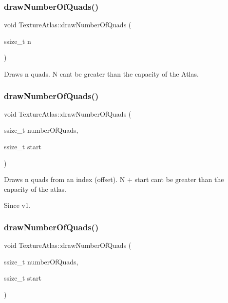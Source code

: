 \subsubsection{\texorpdfstring{draw\+Number\+Of\+Quads()}{drawNumberOfQuads()}\hspace{0.1cm}{\footnotesize\ttfamily [2/4]}}
{\footnotesize\ttfamily void Texture\+Atlas\+::draw\+Number\+Of\+Quads (\begin{DoxyParamCaption}\item[{ssize\+\_\+t}]{n }\end{DoxyParamCaption})}

Draws n quads. N can\textquotesingle{}t be greater than the capacity of the Atlas. \mbox{\label{classTextureAtlas_a991e6b2fb3bd3303a7ef27d4f82d3cdc}} 
\subsubsection{\texorpdfstring{draw\+Number\+Of\+Quads()}{drawNumberOfQuads()}\hspace{0.1cm}{\footnotesize\ttfamily [3/4]}}
{\footnotesize\ttfamily void Texture\+Atlas\+::draw\+Number\+Of\+Quads (\begin{DoxyParamCaption}\item[{ssize\+\_\+t}]{number\+Of\+Quads,  }\item[{ssize\+\_\+t}]{start }\end{DoxyParamCaption})}

Draws n quads from an index (offset). N + start can\textquotesingle{}t be greater than the capacity of the atlas.

\begin{DoxySince}{Since}
v1. 
\end{DoxySince}
\mbox{\label{classTextureAtlas_a991e6b2fb3bd3303a7ef27d4f82d3cdc}} 
\subsubsection{\texorpdfstring{draw\+Number\+Of\+Quads()}{drawNumberOfQuads()}\hspace{0.1cm}{\footnotesize\ttfamily [4/4]}}
{\footnotesize\ttfamily void Texture\+Atlas\+::draw\+Number\+Of\+Quads (\begin{DoxyParamCaption}\item[{ssize\+\_\+t}]{number\+Of\+Quads,  }\item[{ssize\+\_\+t}]{start }\end{DoxyParamCaption})}

